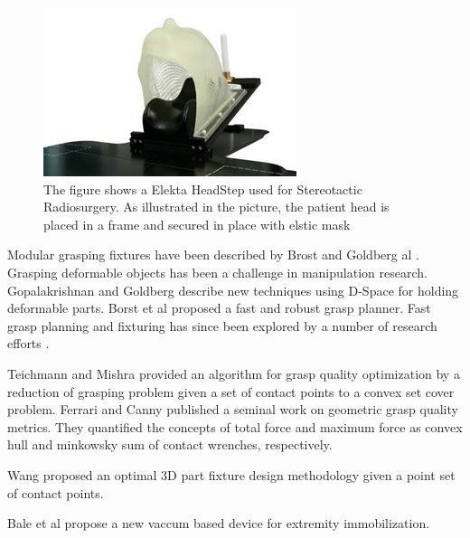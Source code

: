 \begin{figure}[t!]
  \begin{center}
    \includegraphics[width=0.75\linewidth]{images/headstep}
  \end{center}
  \vspace{-10pt}
\caption{ The figure shows a Elekta HeadStep used for Stereotactic Radiosurgery.
As illustrated in the picture, the patient head is placed in a frame and secured in place with elstic mask}
  \vspace*{-15pt}
  \label{fig:HeadStep}
\end{figure}

Modular grasping fixtures have been described by Brost and Goldberg al 
\cite{brost1996complete}. Grasping deformable objects has been a challenge 
in manipulation research. Gopalakrishnan and Goldberg 
\cite{gopalakrishnan2004Dspace} describe new techniques using D-Space for
holding deformable parts. Borst et al \cite{borst1999fast} proposed a 
fast and robust grasp planner. Fast grasp planning and fixturing has since been 
explored by a number of research efforts .


Teichmann and Mishra \cite{teichmann2000probabilistic} provided an algorithm for 
grasp quality optimization by a reduction of grasping problem given a set 
of contact points to a convex set cover problem. Ferrari and Canny
\cite{ferrari1992planning} published a seminal work on
geometric grasp quality metrics. They quantified the concepts of total 
force and maximum force as convex hull and minkowsky sum of contact wrenches,
respectively.

Wang \cite{wang2000optimum} proposed an optimal 3D part fixture design 
methodology given a point set of contact points. 

Bale et al \cite{bale1999new} propose a new vaccum based device for
extremity immobilization.

